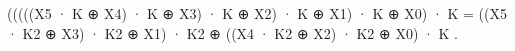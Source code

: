 
(((((X5 · K ⊕ X4) · K ⊕ X3) · K ⊕ X2) · K ⊕ X1) · K ⊕ X0) · K =
((X5 · K2 ⊕ X3) · K2 ⊕ X1) · K2 ⊕ ((X4 · K2 ⊕ X2) · K2 ⊕ X0) · K .


